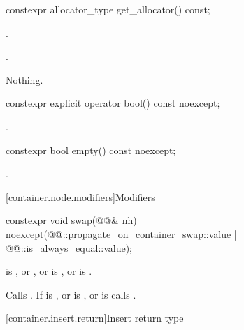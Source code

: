 \begin{itemdecl}
constexpr allocator_type get_allocator() const;
\end{itemdecl}

\begin{itemdescr}
\pnum
\expects
{}.

\pnum
\returns
{}.

\pnum
\throws
Nothing.
\end{itemdescr}

\begin{itemdecl}
constexpr explicit operator bool() const noexcept;
\end{itemdecl}

\begin{itemdescr}
\pnum
\returns
{}.
\end{itemdescr}

\begin{itemdecl}
constexpr bool empty() const noexcept;
\end{itemdecl}

\begin{itemdescr}
\pnum
\returns
{}.
\end{itemdescr}

[container.node.modifiers]{Modifiers}

\begin{itemdecl}
constexpr void swap(@@& nh)
  noexcept(@@::propagate_on_container_swap::value ||
           @@::is_always_equal::value);
\end{itemdecl}

\begin{itemdescr}
\pnum
\expects
{} is , or , or
 is ,
or  is .

\pnum
\effects
Calls . If  is , or
 is , or 
is  calls .
\end{itemdescr}

[container.insert.return]{Insert return type}

